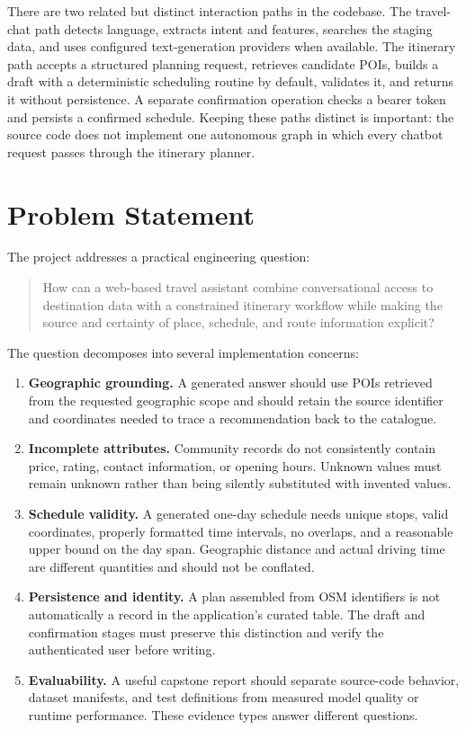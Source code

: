 There are two related but distinct interaction paths in the codebase. The travel-chat path detects language, extracts intent and features, searches the staging data, and uses configured text-generation providers when available. The itinerary path accepts a structured planning request, retrieves candidate POIs, builds a draft with a deterministic scheduling routine by default, validates it, and returns it without persistence. A separate confirmation operation checks a bearer token and persists a confirmed schedule. Keeping these paths distinct is important: the source code does not implement one autonomous graph in which every chatbot request passes through the itinerary planner.

\section{Problem Statement}

The project addresses a practical engineering question:

\begin{quote}
How can a web-based travel assistant combine conversational access to destination data with a constrained itinerary workflow while making the source and certainty of place, schedule, and route information explicit?
\end{quote}

The question decomposes into several implementation concerns:
\begin{enumerate}[leftmargin=1.8em,itemsep=4pt]
    \item \textbf{Geographic grounding.} A generated answer should use POIs retrieved from the requested geographic scope and should retain the source identifier and coordinates needed to trace a recommendation back to the catalogue.
    \item \textbf{Incomplete attributes.} Community records do not consistently contain price, rating, contact information, or opening hours. Unknown values must remain unknown rather than being silently substituted with invented values.
    \item \textbf{Schedule validity.} A generated one-day schedule needs unique stops, valid coordinates, properly formatted time intervals, no overlaps, and a reasonable upper bound on the day span. Geographic distance and actual driving time are different quantities and should not be conflated.
    \item \textbf{Persistence and identity.} A plan assembled from OSM identifiers is not automatically a record in the application's curated  table. The draft and confirmation stages must preserve this distinction and verify the authenticated user before writing.
    \item \textbf{Evaluability.} A useful capstone report should separate source-code behavior, dataset manifests, and test definitions from measured model quality or runtime performance. These evidence types answer different questions.
\end{enumerate}


